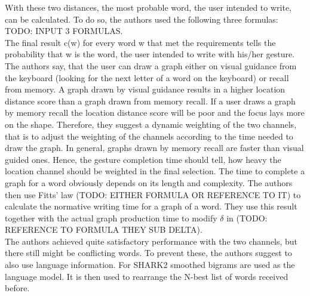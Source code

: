 With these two distances, the most probable word, the user intended to write, can be calculated. To do so, the authors used the following three formulas: TODO: INPUT 3 FORMULAS.\\

The final result c(w) for every word w that met the requirements tells the probability that w is the word, the user intended to write with his/her gesture.\\
The authors say, that the user can draw a graph either on visual guidance from the keyboard (looking for the next letter of a word on the keyboard) or recall from memory. A graph drawn by visual guidance results in a higher location distance score than a graph drawn from memory recall. If a user draws a graph by memory recall the location distance score will be poor and the focus lays more on the shape. Therefore, they suggest a dynamic weighting of the two channels, that is to adjust the weighting of the channels according to the time needed to draw the graph. In general, graphs drawn by memory recall are faster than visual guided ones. Hence, the gesture completion time should tell, how heavy the location channel should be weighted in the final selection. The time to complete a graph for a word obviously depends on its length and complexity. The authors then use Fitts' law (TODO: EITHER FORMULA OR REFERENCE TO IT) to calculate the normative writing time for a graph of a word. They use this result together with the actual graph production time to modify $\delta$ in (TODO: REFERENCE TO FORMULA THEY SUB DELTA).\\
The authors achieved quite satisfactory performance with the two channels, but there still might be conflicting words. To prevent these, the authors suggest to also use language information. For SHARK2 smoothed bigrams are used as the language model. It is then used to rearrange the N-best list of words received before.